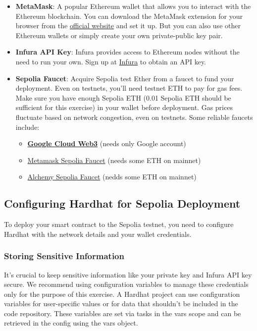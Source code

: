 \documentclass[12pt]{article}
\begin{document}
\begin{itemize}
    \item \textbf{MetaMask}: A popular Ethereum wallet that allows you to interact with the Ethereum blockchain. You can download the MetaMask extension for your browser from the \href{https://metamask.io/}{official website} and set it up. But you can also use other Ethereum wallets or simply create your own private-public key pair.
    
    \item \textbf{Infura API Key}: Infura provides access to Ethereum nodes without the need to run your own. Sign up at \href{https://infura.io/}{Infura} to obtain an API key.
    
    \item \textbf{Sepolia Faucet}: Acquire Sepolia test Ether from a faucet to fund your deployment. Even on testnets, you'll need testnet ETH to pay for gas fees. Make sure you have enough Sepolia ETH (0.01 Sepolia ETH should be sufficient for this exercise) in your wallet before deployment. Gas prices fluctuate based on network congestion, even on testnets. Some reliable faucets include:
    \begin{itemize}
        \item \href{https://cloud.google.com/application/web3/faucet/ethereum/sepolia}{\textbf{Google Cloud Web3}} (needs only Google account)
        \item \href{https://docs.metamask.io/developer-tools/faucet/}{Metamask Sepolia Faucet} (needs some ETH on mainnet)
        \item \href{https://www.alchemy.com/faucets/ethereum-sepolia}{Alchemy Sepolia Faucet}  (nedds some ETH on mainnet)
    \end{itemize}
\end{itemize}

\subsection{Configuring Hardhat for Sepolia Deployment}

To deploy your smart contract to the Sepolia testnet, you need to configure Hardhat with the network details and your wallet credentials.

\subsubsection*{Storing Sensitive Information}

It's crucial to keep sensitive information like your private key and Infura API key secure. We recommend using configuration variables to manage these credentials only for the purpose of this exercise. A Hardhat project can use configuration variables for user-specific values or for data that shouldn't be included in the code repository. These variables are set via tasks in the vars scope and can be retrieved in the config using the vars object. 
\end{document}
